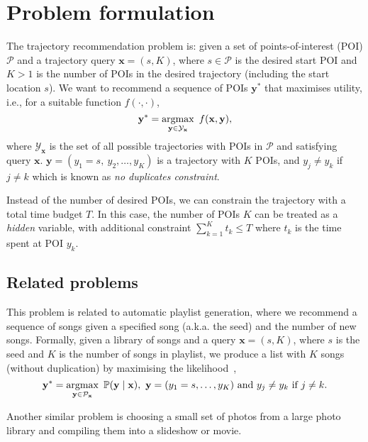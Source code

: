 \section{Problem formulation}
\label{sec:formulation}

The trajectory recommendation problem is: given a set of points-of-interest (POI) $\mathcal{P}$ and a trajectory query $\mathbf{x} = (s, K)$,
where $s \in \mathcal{P}$ is the desired start POI and $K > 1$ is the number of POIs in the desired trajectory (including the start location $s$).
We want to recommend a sequence of POIs $\mathbf{y}^*$ that maximises utility, i.e., for a suitable function $f(\cdot,\cdot)$,
\begin{equation*}
\mathbf{y}^* = \operatorname*{argmax}_{\mathbf{y} \in \mathcal{Y}_\mathbf{x}}~f(\mathbf{x}, \mathbf{y}),
\end{equation*}
where $\mathcal{Y}_\mathbf{x}$ is the set of all possible trajectories with POIs in $\mathcal{P}$ and satisfying query $\mathbf{x}$.
$\mathbf{y} = (y_1 = s,~ y_2, \dots, y_K)$ is a trajectory with $K$ POIs, and $y_j \ne y_k$ if $j \ne k$ 
which is known as \emph{no duplicates constraint}.

Instead of the number of desired POIs, we can constrain the trajectory with a total time budget $T$.
In this case, the number of POIs $K$ can be treated as a \emph{hidden} variable, with additional constraint $\sum_{k=1}^K t_k \le T$ 
where $t_k$ is the time spent at POI $y_k$.



\subsection{Related problems}
\label{sec:related}

This problem is related to automatic playlist generation, 
where we recommend a sequence of songs given a specified song (a.k.a. the seed) and the number of new songs.
Formally, given a library of songs and a query $\mathbf{x} = (s, K)$, where $s$ is the seed and $K$ is the number of songs in playlist,
we produce a list with $K$ songs (without duplication) by maximising the likelihood~\cite{chen2012playlist},
\begin{equation*}
\mathbf{y}^* = \operatorname*{argmax}_{\mathbf{y} \in \mathcal{P}_\mathbf{x}}~ \mathbb{P}(\mathbf{y} \mid \mathbf{x}),~ \mathbf{y} = (y_1=s,\dots,y_K) 
~\text{and}~ y_j \ne y_k ~\text{if}~ j \ne k.
\end{equation*}

Another similar problem is choosing a small set of photos from a large photo library and compiling them into a slideshow or movie.


